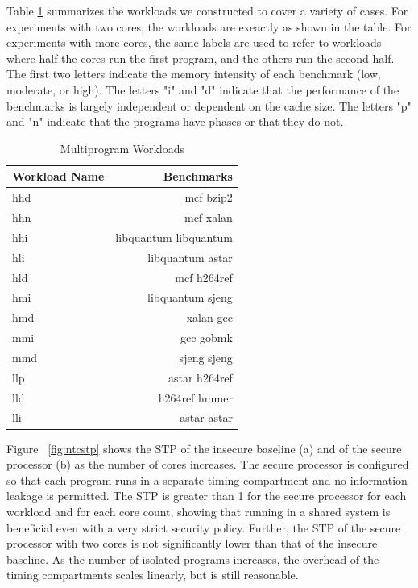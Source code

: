 Table \ref{tab:workloads} summarizes the workloads we constructed to cover a 
variety of cases. For experiments with two cores, the workloads are exeactly as 
shown in the table. For experiments with more cores, the same labels are used 
to refer to workloads where half the cores run the first program, and the 
others run the second half. 
The first two letters indicate the memory intensity 
of each benchmark (low, moderate, or high). The letters "i" and "d" indicate 
that the performance of the benchmarks is largely independent or dependent on 
the cache size. The letters "p" and "n" indicate that the programs have phases 
or that they do not.

\begin{table}
    \caption{ Multiprogram Workloads }
    \centering
\begin{small}
    \begin{tabular}{|l|r|}
        \hline
        Workload Name & Benchmarks \\\hline\hline
        hhd &  mcf bzip2 \\\hline
        hhn &  mcf xalan \\\hline
        hhi &  libquantum libquantum \\\hline
        hli &  libquantum astar \\\hline
        hld &  mcf h264ref \\\hline
        hmi &  libquantum sjeng \\\hline
        hmd &  xalan gcc \\\hline
        mmi &  gcc gobmk \\\hline
        mmd &  sjeng sjeng \\\hline
        llp &  astar h264ref \\\hline
        lld &  h264ref hmmer \\\hline
        lli &  astar astar \\\hline
    \end{tabular}
    \end{small}
    \label{tab:workloads}
\end{table}

Figure ~\ref{fig:ntcstp} shows the STP of the insecure baseline (a) and of the 
secure processor (b) as the number of cores increases. The secure processor is 
configured so that each program runs in a separate timing compartment and no 
information leakage is permitted. The STP is greater than 1 for the secure 
processor for each workload and for each core count, showing that running in a 
shared system is beneficial even with a very strict security policy. Further, 
the STP of the secure processor with two cores is not significantly lower
than that of the insecure baseline. As the number of isolated programs 
increases, the overhead of the timing compartments scales linearly, but is
still reasonable.

